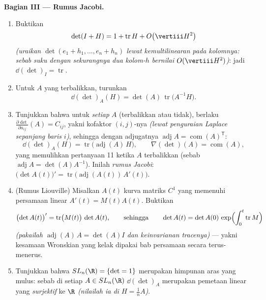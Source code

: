 \begin{problem}
\medskip
\noindent\textbf{Bagian III --- Rumus Jacobi.}
\begin{enumerate}[resume]
  \item Buktikan
        \[
        \det(I + H) = 1 + \operatorname{tr}H +
        O\bigl(\vertiii H^2\bigr)
        \]
        \emph{(uraikan $\det(e_1 + h_1, \dots, e_n + h_n)$ lewat
        kemultilinearan pada kolomnya: sebab suku dengan sekurangnya dua
        kolom-$h$ bernilai $O(\vertiii H^2)$)}: jadi $\dd(\det)_I =
        \operatorname{tr}$.
  \item Untuk $A$ yang terbalikkan, turunkan
        \[
        \dd(\det)_A(H) = \det(A)\,
        \operatorname{tr}\bigl(A^{-1}H\bigr) .
        \]
  \item Tunjukkan bahwa untuk \emph{setiap} $A$ (terbalikkan atau tidak),
        berlaku $\frac{\partial\det}{\partial a_{ij}}(A) = C_{ij}$, yakni
        kofaktor $(i,j)$-nya \emph{(lewat penguraian Laplace sepanjang baris
        $i$)}, sehingga dengan adjugatnya $\operatorname{adj}A =
        \operatorname{com}(A)^{\mathsf T}$:
        \[
        \dd(\det)_A(H) =
        \operatorname{tr}\bigl(\operatorname{adj}(A)\,H\bigr),
        \qquad
        \nabla(\det)(A) = \operatorname{com}(A) ,
        \]
        yang memulihkan pertanyaan 11 ketika $A$ terbalikkan
        (sebab $\operatorname{adj}A = \det(A)A^{-1}$). Inilah
        \emph{rumus Jacobi}: $\bigl(\det
        A(t)\bigr)' = \operatorname{tr}\bigl(
        \operatorname{adj}(A(t))\,A'(t)\bigr)$.
  \item (Rumus Liouville) Misalkan $A(t)$ kurva matriks $C^1$
        yang memenuhi persamaan  linear
        $A'(t) = M(t)A(t)$. Buktikan
        \[
        \bigl(\det A(t)\bigr)' =
        \operatorname{tr}\bigl(M(t)\bigr)\,\det A(t),
        \qquad\text{sehingga}\qquad
        \det A(t) = \det A(0)\,
        \exp\Bigl(\int_0^t\operatorname{tr}M\Bigr)
        \]
        \emph{(pakailah $\operatorname{adj}(A)\,A = \det(A)I$ dan
        keinvarianan  tracenya)} --- yakni kesamaan Wronskian
        yang kelak dipakai bab persamaan  secara terus-menerus.
  \item Tunjukkan bahwa $SL_n(\R) = \{\det = 1\}$ merupakan himpunan aras
        yang mulus: sebab di setiap $A \in SL_n(\R)$ 
        $\dd(\det)_A$ merupakan pemetaan linear yang \emph{surjektif} ke
        $\R$ \emph{(nilailah ia di $H = \frac1nA$)}.
\end{enumerate}


\end{problem}
